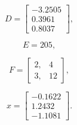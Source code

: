 \documentclass[12pt]{article}
\begin{document}
$$
D=\left[
\begin{array}{c}
   -3.2505\\
    0.3961\\
0.8037
\end{array}
\right],
$$

$$
E=205,
$$

$$
F=\left[
\begin{array}{cc}
     2, &    4\\
3, & 12
\end{array}
\right],
$$

$$
x=\left[
\begin{array}{c}
   -0.1622\\
    1.2432\\
-1.1081
\end{array}
\right].
$$
\end{document}
